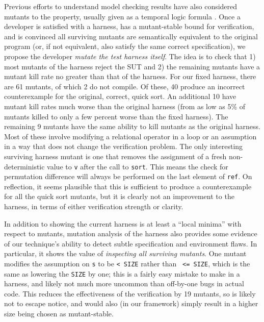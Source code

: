 \documentclass[conference]{IEEEtran}
\begin{document}
Previous efforts to understand model checking results have also
considered mutants to the property, usually given as a temporal logic
formula \cite{MutSpec}.  Once a developer is satisfied with a harness,
has a mutant-stable bound for verification, and is convinced all
surviving mutants are semantically equivalent to the original program
(or, if not equivalent, also satisfy the same correct specification),
we propose the developer \emph{mutate the test harness itself}.  The
idea is to check that 1) most mutants of the harness reject the SUT
and 2) the remaining mutants have a mutant kill rate no greater than
that of the harness.  For our fixed harness, there are 61 mutants, of
which 2 do not compile.  Of these, 40 produce an incorrect
counterexample for the original, correct, quick sort.  An additional
10 have mutant kill rates much worse than the original harness (from
as low as 5\% of mutants killed to only a few percent worse than the
fixed harness).  The remaining 9 mutants have the same ability to kill
mutants as the original harness.  Most of these involve modifying a
relational operator in a loop or an assumption in a way that does not
change the verification problem.  The only interesting surviving
harness mutant is one that removes the assignment of a fresh
non-deterministic value to {\tt v} after the call to {\tt sort}.  This
means the check for permutation difference will always be performed on
the last element of {\tt ref}.  On reflection, it seems plausible
that this is sufficient to produce a counterexample for all the quick
sort mutants, but it is clearly not an improvement to the harness, in
terms of either verification strength or clarity.

In addition to showing the current harness is at least a ``local
minima'' with respect to mutants, mutation analysis of the harness
also provides some evidence of our technique's ability to detect
subtle specification and environment flaws.  In particular, it shows
the value of \emph{inspecting all surviving mutants}.  One mutant
modifies the assumption on {\tt s} to be {\tt < SIZE} rather than {\tt
  <= SIZE}, which is the same as lowering the {\tt SIZE} by one; this
is  a fairly easy mistake to make in a harness, and likely not much more
uncommon than off-by-one bugs in actual code.  This
reduces the effectiveness of the verification by 19 mutants, so is
likely not to escape notice, and would also (in our framework) simply
result in a higher size being chosen as mutant-stable.
\end{document}
